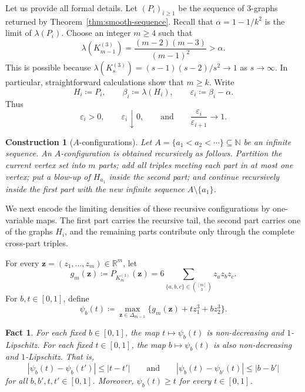\documentclass[10pt]{article}
\numberwithin{equation}{section}
\newtheorem{construction}[theorem]{Construction}
\newtheorem{fact}[theorem]{Fact}
\newcommand{\N}{\mathbb{N}}
\newcommand{\eps}{\varepsilon}
\begin{document}
Let us provide all formal details. Let $(P_i)_{i\ge 1}$ be the sequence of $3$-graphs returned by Theorem~\ref{thm:smooth-sequence}.
Recall that $\alpha=1 - 1/k^2$ is the limit of $\lambda(P_i)$.
Choose an integer $m\ge 4$ such that
\begin{equation}
        \lambda(K_{m-1}^{(3)})=\frac{(m-2)(m-3)}{(m-1)^2}>\alpha .
        \label{eq:m-choice}
\end{equation}
This is possible because $\lambda(K_s^{(3)})=(s-1)(s-2)/s^2\to 1$ as $s\to\infty$. In particular, straightforward calculations show that $m\ge k$.
Write
\[
        H_i\coloneqq P_i, \qquad \beta_i\coloneqq \lambda(H_i), \qquad \eps_i\coloneqq \beta_i-\alpha .
\]
Thus
\begin{equation}
        \eps_i>0, \qquad \eps_i\downarrow 0, \qquad\text{and}\qquad \frac{\eps_i}{\eps_{i+1}}\to 1.
        \label{eq:eps-slow}
\end{equation}



\begin{construction}[$A$-configurations]\label{con:A-config} 
Let $A=\{a_1<a_2<\cdots\}\subseteq\N$ be an infinite sequence. An $A$-configuration is obtained recursively as follows. Partition the current vertex set into $m$ parts; add all triples meeting each part in at most one vertex; put a blow-up of $H_{a_1}$ inside the second part; and continue recursively inside the first part with the new infinite sequence $A\setminus\{a_1\}$. 
\end{construction}

We next encode the limiting densities of these recursive configurations by one-variable maps. The first part carries the recursive tail, the second part carries one of the graphs $H_i$, and the remaining parts contribute only through the complete cross-part triples.

For every $\mathbf{z} = (z_1, \ldots, z_m) \in \mathbb{R}^{m}$, let
\[
        g_m(\mathbf{z})
        \coloneqq P_{K_m^{(3)}}(\mathbf{z})
        = 6\sum_{\{a,b,c\}\in\binom{[m]}{3}}z_az_bz_c .
\]
For $b,t\in[0,1]$, define
\begin{equation}
        \psi_b(t)\coloneqq \max_{\mathbf{z}\in\Delta_{m-1}} \bigl\{ g_m(\mathbf{z})+t z_1^3+bz_2^3\bigr\}.
        \label{eq:psi-def}
\end{equation}
\begin{fact}\label{fact:psi-basic}
For each fixed $b\in[0,1]$, the map $t\mapsto \psi_b(t)$ is non-decreasing and $1$-Lipschitz. For each fixed $t\in[0,1]$, the map $b\mapsto \psi_b(t)$ is also non-decreasing and $1$-Lipschitz. That is,
\[
        |\psi_b(t)-\psi_b(t')|\le |t-t'| \qquad\text{and}\qquad
        |\psi_b(t)-\psi_{b'}(t)|\le |b-b'|
\]
for all $b,b',t,t'\in[0,1]$.
Moreover, $\psi_b(t)\ge t$ for every $t\in[0,1]$.
\end{fact}
\end{document}
